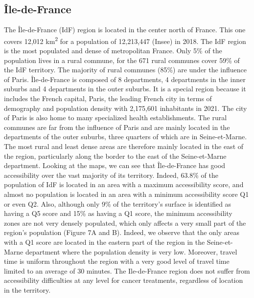 \subsection*{Île-de-France}

The Île-de-France (IdF) region is located in the center north of France. This one covers 12,012 km\textsuperscript{2} for a population of 12,213,447 (Insee) in 2018. The IdF region is the most populated and dense of metropolitan France. Only 5\% of the population lives in a rural commune, for the 671 rural communes cover 59\% of the IdF territory. The majority of rural communes (85\%) are under the influence of Paris. Île-de-France is composed of 8 departments, 4 departments in the inner suburbs and 4 departments in the outer suburbs. It is a special region because it includes the French capital, Paris, the leading French city in terms of demography and population density with 2,175,601 inhabitants in 2021. The city of Paris is also home to many specialized health establishments. The rural communes are far from the influence of Paris and are mainly located in the departments of the outer suburbs, three quarters of which are in Seine-et-Marne. The most rural and least dense areas are therefore mainly located in the east of the region, particularly along the border to the east of the Seine-et-Marne department. Looking at the maps, we can see that Île-de-France has good accessibility over the vast majority of its territory. Indeed, 63.8\% of the population of IdF is located in an area with a maximum accessibility score, and almost no population is located in an area with a minimum accessibility score Q1 or even Q2. Also, although only 9\% of the territory's surface is identified as having a Q5 score and 15\% as having a Q1 score, the minimum accessibility zones are not very densely populated, which only affects a very small part of the region's population (Figure 7A and B). Indeed, we observe that the only areas with a Q1 score are located in the eastern part of the region in the Seine-et-Marne department where the population density is very low. Moreover, travel time is uniform throughout the region with a very good level of travel time limited to an average of 30 minutes. The Ile-de-France region does not suffer from accessibility difficulties at any level for cancer treatments, regardless of location in the territory.

